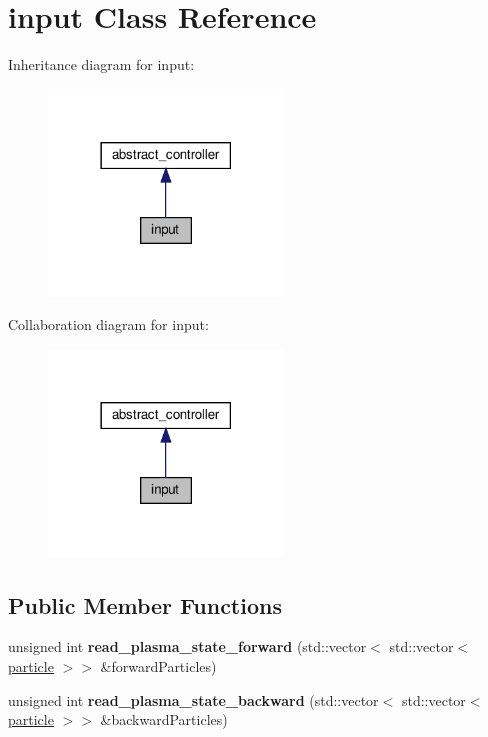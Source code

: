 \hypertarget{classinput}{}\section{input Class Reference}
\label{classinput}


Inheritance diagram for input\+:\nopagebreak
\begin{figure}[H]
\begin{center}
\leavevmode
\includegraphics[width=177pt]{classinput__inherit__graph}
\end{center}
\end{figure}


Collaboration diagram for input\+:\nopagebreak
\begin{figure}[H]
\begin{center}
\leavevmode
\includegraphics[width=177pt]{classinput__coll__graph}
\end{center}
\end{figure}
\subsection*{Public Member Functions}
\begin{DoxyCompactItemize}
\item 
\mbox{\label{classinput_a26c2b30593898a6ad3806d3e548f6002}} 
unsigned int {\bfseries read\+\_\+plasma\+\_\+state\+\_\+forward} (std\+::vector$<$ std\+::vector$<$ \hyperlink{classparticle}{particle} $>$$>$ \&forward\+Particles)
\item 
\mbox{\label{classinput_a9b874ae8e6cdc97cb9b2d2989aa26a68}} 
unsigned int {\bfseries read\+\_\+plasma\+\_\+state\+\_\+backward} (std\+::vector$<$ std\+::vector$<$ \hyperlink{classparticle}{particle} $>$$>$ \&backward\+Particles)
\end{DoxyCompactItemize}
